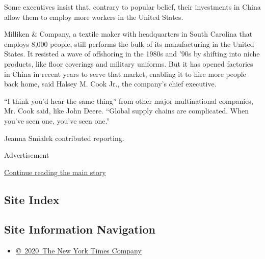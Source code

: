 Some executives insist that, contrary to popular belief, their
investments in China allow them to employ more workers in the United
States.

Milliken \& Company, a textile maker with headquarters in South Carolina
that employs 8,000 people, still performs the bulk of its manufacturing
in the United States. It resisted a wave of offshoring in the 1980s and
'90s by shifting into niche products, like floor coverings and military
uniforms. But it has opened factories in China in recent years to serve
that market, enabling it to hire more people back home, said Halsey M.
Cook Jr., the company's chief executive.

``I think you'd hear the same thing'' from other major multinational
companies, Mr. Cook said, like John Deere. ``Global supply chains are
complicated. When you've seen one, you've seen one.''

Jeanna Smialek contributed reporting.

Advertisement

\protect\hyperlink{after-bottom}{Continue reading the main story}

\hypertarget{site-index}{%
\subsection{Site Index}\label{site-index}}

\hypertarget{site-information-navigation}{%
\subsection{Site Information
Navigation}\label{site-information-navigation}}

\begin{itemize}
\tightlist
\item
  \href{https://help.nytimes.com/hc/en-us/articles/115014792127-Copyright-notice}{©~2020~The
  New York Times Company}
\end{itemize}

